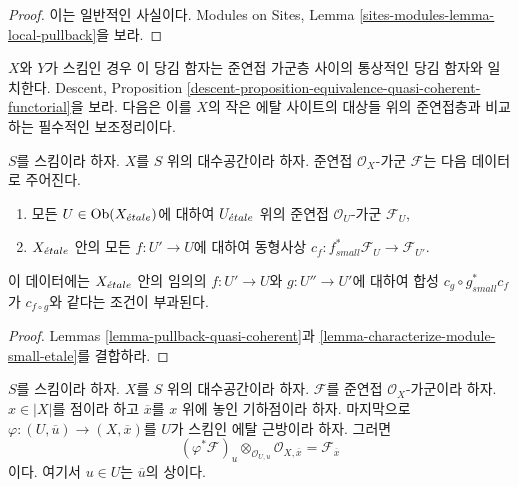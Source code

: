 \begin{proof}
이는 일반적인 사실이다. Modules on Sites, Lemma
\ref{sites-modules-lemma-local-pullback}을 보라.
\end{proof}

\noindent
$X$와 $Y$가 스킴인 경우 이 당김 함자는 준연접 가군층 사이의 통상적인
당김 함자와 일치한다. Descent, Proposition
\ref{descent-proposition-equivalence-quasi-coherent-functorial}을 보라.
다음은 이를 $X$의 작은 에탈 사이트의 대상들 위의 준연접층과 비교하는
필수적인 보조정리이다.

\begin{lemma}
\label{lemma-characterize-quasi-coherent-small-etale}
$S$를 스킴이라 하자. $X$를 $S$ 위의 대수공간이라 하자.
준연접 $\mathcal{O}_X$-가군 $\mathcal{F}$는 다음 데이터로 주어진다.
\begin{enumerate}
\item 모든 $U \in \mathop{\mathrm{Ob}}\nolimits(X_{\acute{e}tale})$에 대하여 $U_{\acute{e}tale}$ 위의 준연접
$\mathcal{O}_U$-가군 $\mathcal{F}_U$,
\item $X_{\acute{e}tale}$ 안의 모든 $f : U' \to U$에 대하여 동형사상
$c_f : f_{small}^*\mathcal{F}_U \to \mathcal{F}_{U'}$.
\end{enumerate}
이 데이터에는 $X_{\acute{e}tale}$ 안의 임의의 $f : U' \to U$와
$g : U'' \to U'$에 대하여 합성 $c_g \circ g_{small}^*c_f$가
$c_{f \circ g}$와 같다는 조건이 부과된다.
\end{lemma}

\begin{proof}
Lemmas \ref{lemma-pullback-quasi-coherent}과
\ref{lemma-characterize-module-small-etale}를 결합하라.
\end{proof}

\begin{lemma}
\label{lemma-stalk-quasi-coherent}
$S$를 스킴이라 하자.
$X$를 $S$ 위의 대수공간이라 하자.
$\mathcal{F}$를 준연접 $\mathcal{O}_X$-가군이라 하자.
$x \in |X|$를 점이라 하고 $\overline{x}$를 $x$ 위에 놓인 기하점이라
하자. 마지막으로 $\varphi : (U, \overline{u}) \to (X, \overline{x})$를
$U$가 스킴인 에탈 근방이라 하자. 그러면
$$
(\varphi^*\mathcal{F})_u \otimes_{\mathcal{O}_{U, u}}
\mathcal{O}_{X, \overline{x}} =
\mathcal{F}_{\overline{x}}
$$
이다. 여기서 $u \in U$는 $\overline{u}$의 상이다.
\end{lemma}


